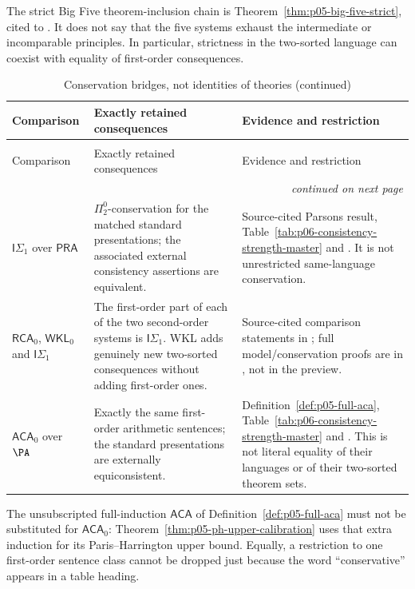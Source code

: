 The strict Big Five theorem-inclusion chain is
Theorem~\ref{thm:p05-big-five-strict}, cited to \textcite{Simpson2009}.
It does not say that the five systems exhaust the intermediate or
incomparable principles. In particular, strictness in the two-sorted
language can coexist with equality of first-order consequences.

\begingroup\small
\begin{longtable}{@{}p{}p{}p{}@{}}
\caption{Conservation bridges, not identities of theories.}
\label{tab:p14-strength-conservation}\\
\toprule
Comparison & Exactly retained consequences & Evidence and restriction \\
\midrule
\endfirsthead
\caption[]{Conservation bridges, not identities of theories (continued)}\\
\toprule
Comparison & Exactly retained consequences & Evidence and restriction \\
\midrule
\endhead
\midrule\multicolumn{3}{r}{\emph{continued on next page}}\\
\endfoot
\endlastfoot
\(\mathsf I\Sigma_1\) over \(\mathsf{PRA}\) &
\(\Pi^0_2\)-conservation for the matched standard presentations;
the associated external consistency assertions are equivalent. &
Source-cited Parsons result, Table~\ref{tab:p06-consistency-strength-master}
and \cite{Parsons1970}. It is not unrestricted same-language conservation. \\
\addlinespace
\(\mathsf{RCA}_0\), \(\mathsf{WKL}_0\) and
\(\mathsf I\Sigma_1\) &
The first-order part of each of the two second-order systems is
\(\mathsf I\Sigma_1\). WKL adds genuinely new two-sorted consequences
without adding first-order ones. &
Source-cited comparison statements in
\cite[Remarks~I.7.6, I.10.5; outline~I.13]{Simpson2006ComparisonPreview};
full model/conservation proofs are in
\cite[Sections~IX.1--IX.3]{Simpson2009}, not in the preview. \\
\addlinespace
\(\mathsf{ACA}_0\) over \(\PA\) &
Exactly the same first-order arithmetic sentences; the standard
presentations are externally equiconsistent. &
Definition~\ref{def:p05-full-aca},
Table~\ref{tab:p06-consistency-strength-master} and
\cite[Section~IX.1]{Simpson2009}. This is not literal equality of their
languages or of their two-sorted theorem sets. \\
\bottomrule
\end{longtable}
\endgroup

The unsubscripted full-induction \(\mathsf{ACA}\) of
Definition~\ref{def:p05-full-aca} must not be substituted for
\(\mathsf{ACA}_0\): Theorem~\ref{thm:p05-ph-upper-calibration} uses that
extra induction for its Paris--Harrington upper bound. Equally, a restriction
to one first-order sentence class cannot be dropped just because the word
``conservative'' appears in a table heading.


